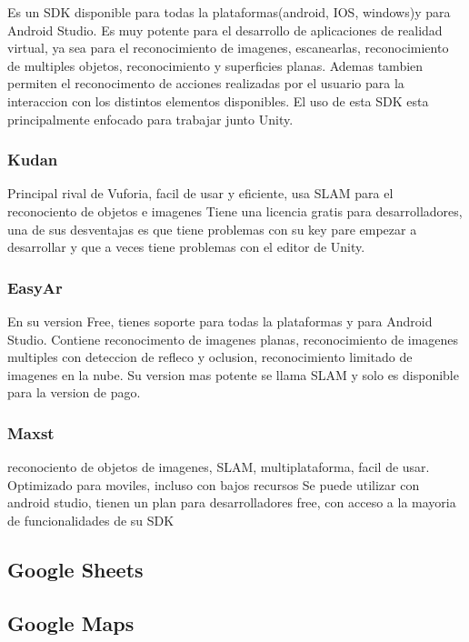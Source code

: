 Es un SDK disponible para todas la plataformas(android, IOS, windows)y para Android Studio. Es muy potente para el desarrollo de aplicaciones de
realidad virtual, ya sea para el reconocimiento de imagenes, escanearlas, reconocimiento de multiples objetos, reconocimiento
y superficies planas. Ademas tambien permiten el reconocimento de acciones realizadas por el usuario para la interaccion con
los distintos elementos disponibles. El uso de esta SDK esta principalmente enfocado para trabajar junto Unity.


\subsubsection{Kudan}
Principal rival de Vuforia, facil de usar y eficiente, usa SLAM para el reconociento de objetos e imagenes
Tiene una licencia gratis para desarrolladores, una de sus desventajas es que tiene problemas con su key pare empezar a desarrollar y que a
veces tiene problemas con el editor de Unity.


\subsubsection{EasyAr}

En su version Free, tienes soporte para todas la plataformas y para Android Studio. Contiene reconocimento de imagenes planas, reconocimiento 
de imagenes multiples con deteccion de refleco y oclusion, reconocimiento limitado de imagenes en la nube.
    Su version mas potente se llama SLAM y solo es disponible para la version de pago.

  

\subsubsection{Maxst}

reconociento de objetos de imagenes, SLAM, multiplataforma, facil de usar. Optimizado para moviles, incluso con bajos recursos
Se puede utilizar con android studio, tienen un plan para desarrolladores free, con acceso a la mayoria de funcionalidades de su SDK


\subsection{Google Sheets}
\subsection{Google Maps}
